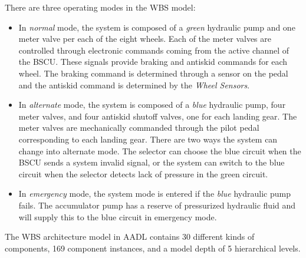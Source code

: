 There are three operating modes in the WBS model:

\begin{itemize}
	\renewcommand{\labelitemi}{\textbullet}
	\item In \textit{normal} mode, the system is composed of a \textit{green} hydraulic pump and one meter valve per each of the eight wheels. Each of the meter valves are controlled through electronic commands coming from the active channel of the BSCU. These signals provide braking and antiskid commands for each wheel. The braking command is determined through a sensor on the pedal and the antiskid command is determined by the \textit{Wheel Sensors}. 
	\item In \textit{alternate} mode, the system is composed of a \textit{blue} hydraulic pump, four meter valves, and four antiskid shutoff valves, one for each landing gear. The meter valves are mechanically commanded through the pilot pedal corresponding to each landing gear. There are two ways the system can change into alternate mode. The selector can choose the blue circuit when the BSCU sends a system invalid signal, or the system can switch to the blue circuit when the selector detects lack of pressure in the green circuit.
	\item In \textit{emergency} mode, the system mode is entered if the \textit{blue} hydraulic pump fails. The accumulator pump has a reserve of pressurized hydraulic fluid and will supply this to the blue circuit in emergency mode. 
\end{itemize}

The WBS architecture model in AADL contains 30 different kinds of components, 169 component instances, and a model depth of 5 hierarchical levels. 





